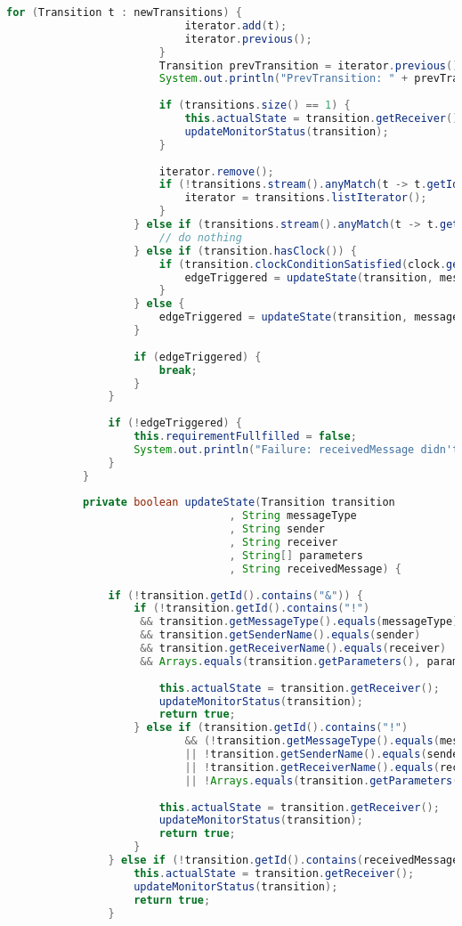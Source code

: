 \begin{lstlisting}[language=java, caption={példa unit teszteset.},captionpos=b]
						for (Transition t : newTransitions) {
							iterator.add(t);
							iterator.previous();
						}
						Transition prevTransition = iterator.previous();
						System.out.println("PrevTransition: " + prevTransition.getId());
						
						if (transitions.size() == 1) {
							this.actualState = transition.getReceiver();
							updateMonitorStatus(transition);
						}
						
						iterator.remove();
						if (!transitions.stream().anyMatch(t -> t.getId().contains("epsilon"))) {
							iterator = transitions.listIterator();
						}
					} else if (transitions.stream().anyMatch(t -> t.getId().contains("epsilon"))) {
						// do nothing
					} else if (transition.hasClock()) {
						if (transition.clockConditionSatisfied(clock.getClock(transition.getClock()))) {
							edgeTriggered = updateState(transition, messageType, sender, receiver, parameters, receivedMessage);
						}
					} else {
						edgeTriggered = updateState(transition, messageType, sender, receiver, parameters, receivedMessage);
					}
					
					if (edgeTriggered) {
						break;
					}
				}
				
				if (!edgeTriggered) {
					this.requirementFullfilled = false;
					System.out.println("Failure: receivedMessage didn't match any transitions.");
				}
			}
			
			private boolean updateState(Transition transition
								   , String messageType
								   , String sender
								   , String receiver
								   , String[] parameters
								   , String receivedMessage) {
		
				if (!transition.getId().contains("&")) {
					if (!transition.getId().contains("!")
					 && transition.getMessageType().equals(messageType)
					 && transition.getSenderName().equals(sender)
					 && transition.getReceiverName().equals(receiver)
					 && Arrays.equals(transition.getParameters(), parameters)) {
		
						this.actualState = transition.getReceiver();
						updateMonitorStatus(transition);
						return true;
					} else if (transition.getId().contains("!")
							&& (!transition.getMessageType().equals(messageType)
							|| !transition.getSenderName().equals(sender)
							|| !transition.getReceiverName().equals(receiver)
							|| !Arrays.equals(transition.getParameters(), parameters))) {
		
						this.actualState = transition.getReceiver();
						updateMonitorStatus(transition);
						return true;
					}
				} else if (!transition.getId().contains(receivedMessage)) {
					this.actualState = transition.getReceiver();
					updateMonitorStatus(transition);
					return true;
				}
				

\end{lstlisting}
